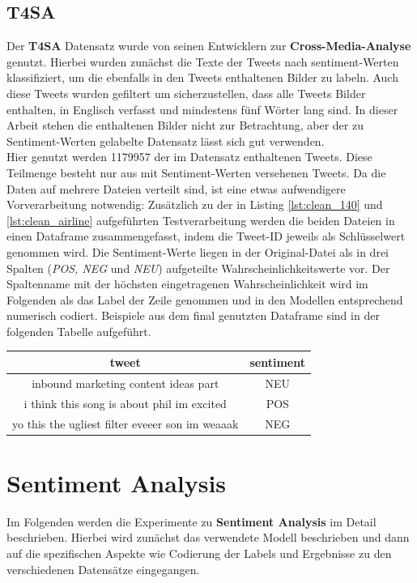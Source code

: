 \subsection{T4SA}
\label{sec:t4sa}
Der \textbf{T4SA} Datensatz \cite{t4sa} wurde von seinen Entwicklern zur \textbf{Cross-Media-Analyse} genutzt. Hierbei wurden zun\"achst die Texte der Tweets nach sentiment-Werten klassifiziert, um die ebenfalls in den Tweets enthaltenen Bilder zu labeln. Auch diese Tweets wurden gefiltert um sicherzustellen, dass alle Tweets Bilder enthalten, in Englisch verfasst und mindestens f\"unf W\"orter lang sind. In dieser Arbeit stehen die enthaltenen Bilder nicht zur Betrachtung, aber der zu Sentiment-Werten gelabelte Datensatz l\"asst sich gut verwenden.\\
Hier genutzt werden 1179957 der im Datensatz enthaltenen Tweets. Diese Teilmenge besteht nur aus mit Sentiment-Werten versehenen Tweets. Da die Daten auf mehrere Dateien verteilt sind, ist eine etwas aufwendigere Vorverarbeitung notwendig: Zus\"atzlich zu der in Listing \ref{lst:clean_140} und \ref{lst:clean_airline} aufgef\"uhrten Testverarbeitung werden die beiden Dateien in einen Dataframe zusammengefasst, indem die Tweet-ID jeweils als Schl\"usselwert genommen wird. Die Sentiment-Werte liegen in der Original-Datei als in drei Spalten (\textit{POS, NEG} und \textit{NEU}) aufgeteilte Wahrscheinlichkeitswerte vor. Der Spaltenname mit der h\"ochsten eingetragenen Wahrscheinlichkeit wird im Folgenden als das Label der Zeile genommen und in den Modellen entsprechend numerisch codiert. Beispiele aus dem final genutzten Dataframe sind in der folgenden Tabelle aufgef\"uhrt.
\begin{center}
\begin{tabular}{|c|c|}
\hline
tweet & sentiment\\ 
\hline\hline
inbound marketing content ideas part&NEU\\
\hline
i think this song is about phil im excited&POS\\
\hline
yo this the ugliest filter eveeer son  im weaaak&NEG\\
\hline    
\end{tabular}
\end{center}


\section{Sentiment Analysis}
Im Folgenden werden die Experimente zu \textbf{Sentiment Analysis} im Detail beschrieben. Hierbei wird zun\"achst das verwendete Modell beschrieben und dann auf die spezifischen Aspekte wie Codierung der Labels und Ergebnisse zu den verschiedenen Datens\"atze eingegangen.

